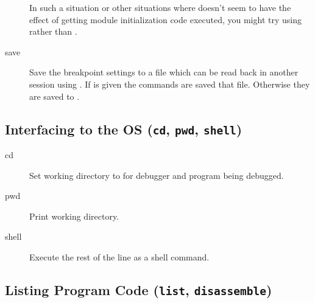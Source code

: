 \begin{description}
In such a situation or other situations where  doesn't seem
to have the effect of getting module initialization code executed,
you might try using  rather than .

\item[save \optional{\var{all|break}} \optional{\var{filename}}\label{command:save}]

Save the breakpoint settings to a file which can be read back in
another session using . If  is given the
commands are saved that file. Otherwise they are saved to
.

\end{description}

\subsection{Interfacing to the OS ({\tt cd}, {\tt pwd},
  {\tt shell})\label{subsection-os}}

\begin{description}

\item[cd ]\label{command:cd}

Set working directory to  for debugger and program
being debugged.

\item[pwd]\label{command:pwd}

Print working directory.  

\item[shell ]\label{command:shell}

Execute the rest of the line as a shell command.


\end{description}

\subsection{Listing Program Code ({\tt list}, {\tt disassemble})\label{subsection-listing}}

